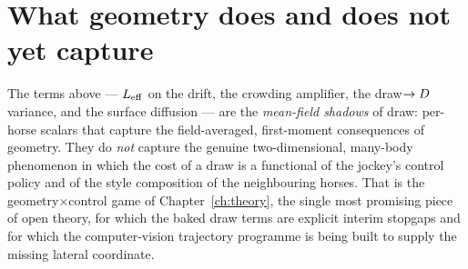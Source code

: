 \section{What geometry does and does not yet capture}

The terms above --- ${L_{\mathrm{eff}}}$ on the drift, the crowding amplifier, the draw$\to D$ variance, and
the surface diffusion --- are the \emph{mean-field shadows} of draw: per-horse scalars that capture
the field-averaged, first-moment consequences of geometry. They do \emph{not} capture the genuine
two-dimensional, many-body phenomenon in which the cost of a draw is a functional of the jockey's
control policy and of the style composition of the neighbouring horses. That is the
geometry$\times$control game of Chapter~\ref{ch:theory}, the single most promising piece of open
theory, for which the baked draw terms are explicit interim stopgaps and for which the
computer-vision trajectory programme is being built to supply the missing lateral coordinate.
